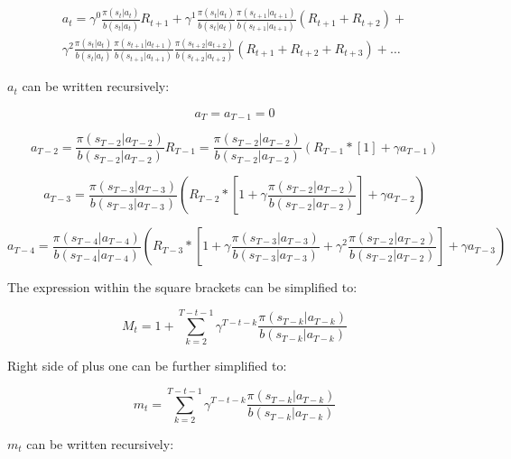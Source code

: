 \documentclass[11pt]{article}
\begin{document}
    \begin{align*}
        a_t = \gamma^0 \frac{\pi(s_{t}|a_{t})}{b(s_{t}|a_{t})} R_{t+1} + \gamma^1 \frac{\pi(s_{t}|a_{t})}{b(s_{t}|a_{t})} \frac{\pi(s_{t+1}|a_{t+1})}{b(s_{t+1}|a_{t+1})} (R_{t+1} + R_{t+2}) + \\
        \gamma^2 \frac{\pi(s_{t}|a_{t})}{b(s_{t}|a_{t})} \frac{\pi(s_{t+1}|a_{t+1})}{b(s_{t+1}|a_{t+1})} \frac{\pi(s_{t+2}|a_{t+2})}{b(s_{t+2}|a_{t+2})} (R_{t+1} + R_{t+2} + R_{t+3})+ \dots
    \end{align*}

    $a_{t}$ can be written recursively:

    \begin{equation}
        a_T = a_{T-1} = 0
    \end{equation}

    \begin{equation}
        a_{T-2} = \frac{\pi(s_{T-2}|a_{T-2})}{b(s_{T-2}|a_{T-2})} R_{T-1} = \frac{\pi(s_{T-2}|a_{T-2})}{b(s_{T-2}|a_{T-2})} ( R_{T-1} * [1] + \gamma a_{T-1} )
    \end{equation}

    \begin{equation}
        a_{T-3} = \frac{\pi(s_{T-3}|a_{T-3})}{b(s_{T-3}|a_{T-3})} ( R_{T-2} * [1 + \gamma \frac{\pi(s_{T-2}|a_{T-2})}{b(s_{T-2}|a_{T-2})}] + \gamma a_{T-2} )
    \end{equation}

    \begin{equation}
        a_{T-4} = \frac{\pi(s_{T-4}|a_{T-4})}{b(s_{T-4}|a_{T-4})} ( R_{T-3} * [1 + \gamma \frac{\pi(s_{T-3}|a_{T-3})}{b(s_{T-3}|a_{T-3})} + \gamma^2 \frac{\pi(s_{T-2}|a_{T-2})}{b(s_{T-2}|a_{T-2})} ] + \gamma a_{T-3} )
    \end{equation}

    The expression within the square brackets can be simplified to:

    \begin{equation}
        M_{t} = 1 + \sum_{k=2}^{T-t-1} \gamma^{T-t-k}  \frac{\pi(s_{T-k}|a_{T-k})}{b(s_{T-k}|a_{T-k})}
    \end{equation}

    Right side of plus one can be further simplified to:

    \begin{equation}
        m_{t} = \sum_{k=2}^{T-t-1} \gamma^{T-t-k}  \frac{\pi(s_{T-k}|a_{T-k})}{b(s_{T-k}|a_{T-k})}
    \end{equation}

    $m_{t}$ can be written recursively:
\end{document}
